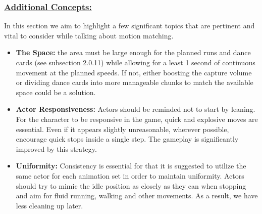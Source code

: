 \documentclass[12pt]{book}
\begin{document}
\subsubsection{\underline{\textbf{Additional Concepts:}}}
In this section we aim to highlight a few significant topics that are pertinent and vital to
consider while talking about motion matching.
\begin{itemize}
    \item \textbf{The Space: }the area must be large enough for the planned runs and dance cards
          (see subsection 2.0.11) while allowing for a least 1 second of continuous movement at the
          planned speeds. If not, either boosting the capture volume or dividing dance cards into
          more manageable chunks to match the available space could be a solution.
    \item \textbf{Actor Responsiveness: }Actors should be reminded not to start by leaning. For the
          character to be responsive in the game, quick and explosive moves are essential. Even if
          it appears slightly unreasonable, wherever possible, encourage quick stops inside a single
          step. The gameplay is significantly improved by this strategy.
    \item \textbf{Uniformity:} Consistency is essential for that it is suggested to utilize the same actor
          for each animation set in order to maintain uniformity. Actors should try to mimic the idle position as closely as they can when stopping and aim for fluid running, walking and
          other movements. As a result, we have less cleaning up later.
\end{itemize}
\end{document}
